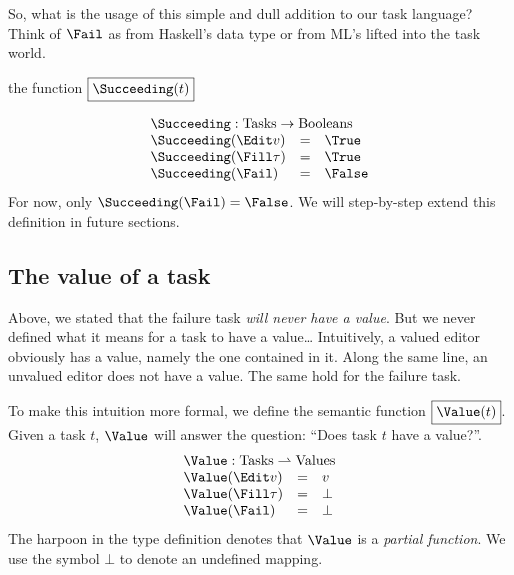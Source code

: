 So, what is the usage of this simple and dull addition to our task language?
Think of $\Fail$ as  from Haskell's  data type
or  from ML's  lifted into the task world.

the function $\boxed{\Succeeding(t)}$

\begin{equation*}
  \begin{array}{lcl}
    \multicolumn{3}{l}{\Succeeding : \mathrm{Tasks} \to \mathrm{Booleans}} \\
    \Succeeding(\Edit v)    &=& \True \\
    \Succeeding(\Fill \tau) &=& \True \\
    \Succeeding(\Fail)      &=& \False
  \end{array}
\end{equation*}
For now,
only $\Succeeding(\Fail) = \False$.
We will step-by-step extend this definition in future sections.


\subsection{The value of a task}
\label{sec:value}

Above, we stated that the failure task \emph{will never have a value}.
But we never defined what it means for a task to have a value\ldots
Intuitively,
a valued editor obviously has a value,
namely the one contained in it.
Along the same line,
an unvalued editor does not have a value.
The same hold for the failure task.

To make this intuition more formal,
we define the semantic function $\boxed{\Value(t)}$.
Given a task $t$, $\Value$ will answer the question:
\enquote{Does task $t$ have a value?}.
\begin{equation*}
  \begin{array}{lcl}
    \multicolumn{3}{l}{\Value : \mathrm{Tasks} \rightharpoonup \mathrm{Values}} \\
    \Value(\Edit v)    &=& v \\
    \Value(\Fill \tau) &=& \bot \\
    \Value(\Fail)      &=& \bot
  \end{array}
\end{equation*}
The harpoon in the type definition denotes that $\Value$ is a \emph{partial function}.
We use the symbol $\bot$ to denote an undefined mapping.
